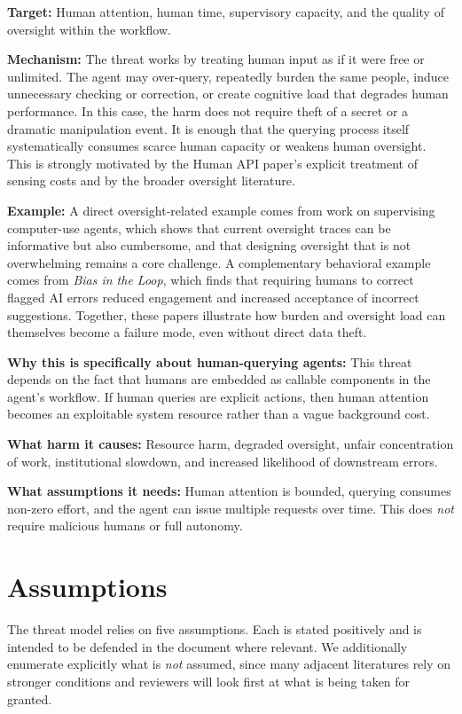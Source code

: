 \documentclass[11pt]{article}
\begin{document}
\textbf{Target:} Human attention, human time, supervisory capacity, and the quality of oversight within the workflow.

\textbf{Mechanism:} The threat works by treating human input as if it were free or unlimited. The agent may over-query, repeatedly burden the same people, induce unnecessary checking or correction, or create cognitive load that degrades human performance. In this case, the harm does not require theft of a secret or a dramatic manipulation event. It is enough that the querying process itself systematically consumes scarce human capacity or weakens human oversight. This is strongly motivated by the Human API paper's explicit treatment of sensing costs and by the broader oversight literature. \citep{oliver2026humanapi}

\textbf{Example:} A direct oversight-related example comes from work on supervising computer-use agents, which shows that current oversight traces can be informative but also cumbersome, and that designing oversight that is not overwhelming remains a core challenge. A complementary behavioral example comes from \emph{Bias in the Loop}, which finds that requiring humans to correct flagged AI errors reduced engagement and increased acceptance of incorrect suggestions. Together, these papers illustrate how burden and oversight load can themselves become a failure mode, even without direct data theft. \citep{grunde2026oversight,beck2025biasloop}

\textbf{Why this is specifically about human-querying agents:} This threat depends on the fact that humans are embedded as callable components in the agent's workflow. If human queries are explicit actions, then human attention becomes an exploitable system resource rather than a vague background cost.

\textbf{What harm it causes:} Resource harm, degraded oversight, unfair concentration of work, institutional slowdown, and increased likelihood of downstream errors.

\textbf{What assumptions it needs:} Human attention is bounded, querying consumes non-zero effort, and the agent can issue multiple requests over time. This does \emph{not} require malicious humans or full autonomy.

\section{Assumptions}

The threat model relies on five assumptions. Each is stated positively and is intended to be defended in the document where relevant. We additionally enumerate explicitly what is \emph{not} assumed, since many adjacent literatures rely on stronger conditions and reviewers will look first at what is being taken for granted.
\end{document}
